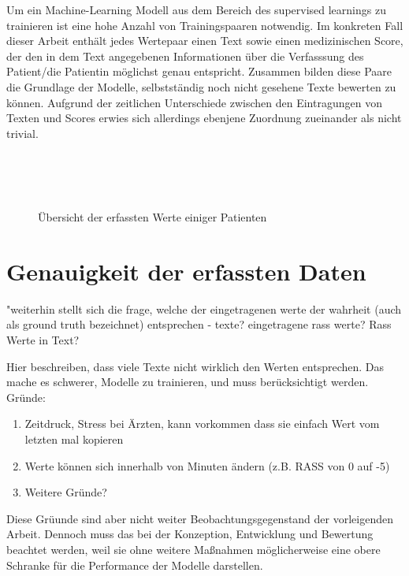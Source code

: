 Um ein Machine-Learning Modell aus dem Bereich des supervised learnings zu trainieren ist eine hohe Anzahl von Trainingspaaren notwendig. Im konkreten Fall dieser Arbeit enthält jedes Wertepaar einen Text sowie einen medizinischen Score, der den in dem Text angegebenen Informationen über die Verfasssung des Patient/die Patientin möglichst genau entspricht. Zusammen bilden diese Paare die Grundlage der Modelle, selbstständig noch nicht gesehene Texte bewerten zu können.
Aufgrund der zeitlichen Unterschiede zwischen den Eintragungen von Texten und Scores erwies sich allerdings ebenjene Zuordnung zueinander als nicht trivial.

\begin{figure}
    \centering
     \\
     \\
     \\
    \caption{Übersicht der erfassten Werte einiger Patienten}
    \label{fig:pat_example_scatterplots}
\end{figure}

\section{Genauigkeit der erfassten Daten}
"weiterhin stellt sich die frage, welche der eingetragenen werte der wahrheit (auch als ground truth bezeichnet) entsprechen - texte? eingetragene rass werte? Rass Werte in Text?

Hier beschreiben, dass viele Texte nicht wirklich den Werten entsprechen. Das mache es schwerer, Modelle zu trainieren, und muss berücksichtigt werden. Gründe:
\begin{enumerate}
    \item Zeitdruck, Stress bei Ärzten, kann vorkommen dass sie einfach Wert vom letzten mal kopieren
    \item Werte können sich innerhalb von Minuten ändern (z.B. RASS von 0 auf -5)
    \item Weitere Gründe?
\end{enumerate}
Diese Grüunde sind aber nicht weiter Beobachtungsgegenstand der vorleigenden Arbeit. Dennoch muss das bei der Konzeption, Entwicklung und Bewertung beachtet werden, weil sie ohne weitere Maßnahmen möglicherweise eine obere Schranke für die Performance der Modelle darstellen.

